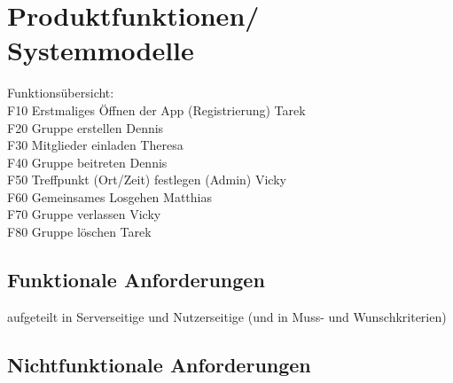 \section{Produktfunktionen/ Systemmodelle}
Funktionsübersicht: \\
F10 Erstmaliges Öffnen der App (Registrierung) Tarek \\
F20 Gruppe erstellen Dennis \\
F30 Mitglieder einladen Theresa \\
F40 Gruppe beitreten Dennis \\
F50 Treffpunkt (Ort/Zeit) festlegen (Admin) Vicky \\
F60 Gemeinsames Losgehen Matthias \\
F70 Gruppe verlassen Vicky \\
F80 Gruppe löschen Tarek \\
\subsection{Funktionale Anforderungen}
aufgeteilt in Serverseitige und Nutzerseitige 
(und in Muss- und Wunschkriterien)
\subsection{Nichtfunktionale Anforderungen}